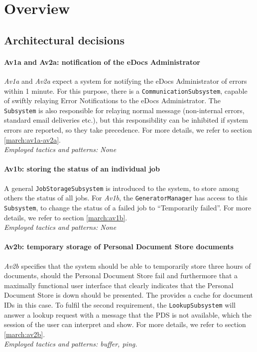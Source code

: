 \section{Overview}\label{sec:overview}
\subsection{Architectural decisions}

\paragraph{Av1a and Av2a: notification of the eDocs Administrator}
\emph{Av1a} and \emph{Av2a} expect a system for notifying the eDocs Administrator of errors within 1 minute. For this purpose, there is a \texttt{CommunicationSubsystem}, capable of swiftly relaying Error Notifications to the eDocs Administrator. The \texttt{Subsystem} is also responsible for relaying normal message (non-internal errors, standard email deliveries etc.), but this responsibility can be inhibited if system errors are reported, so they take precedence. For more details, we refer to section \ref{march:av1a-av2a}.\\
\emph{Employed tactics and patterns: None}
    
\paragraph{Av1b: storing the status of an individual job}
A general \texttt{JobStorageSubsystem} is introduced to the system, to store among others the status of all jobs. For \emph{Av1b}, the \texttt{GeneratorManager} has access to this \texttt{Subsystem}, to change the status of a failed job to ``Temporarily failed''. For more details, we refer to section \ref{march:av1b}.\\
\emph{Employed tactics and patterns: None}
    
\paragraph{Av2b: temporary storage of Personal Document Store documents} \emph{Av2b} specifies that the system should be able to temporarily store three hours of documents, should the Personal Document Store fail and furthermore that a maximally functional user interface that clearly indicates that the Personal Document Store is down should be presented. The  provides a cache for document IDs in this case. To fulfil the second requirement, the \texttt{LookupSubsystem} will answer a lookup request with a message that the PDS is not available, which the session of the user can interpret and show. For more details, we refer to section \ref{march:av2b}.\\
\emph{Employed tactics and patterns: buffer, ping.}
    
